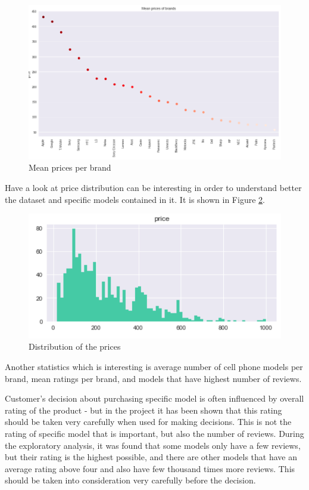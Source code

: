 \documentclass[11pt]{article}
\begin{document}
  \begin{figure}[h!]
    \centering
      \includegraphics[width=\linewidth]{meanPrices.png}
    \caption{Mean prices per brand}
    \label{fig:meanPricePerBrand}
  \end{figure}
  
  Have a look at price distribution can be interesting in order to understand better the dataset and specific models contained in it. It is shown in Figure \ref{fig:priceDistribution}. 
  
  \begin{figure}[h!]
    \centering
      \includegraphics[width=\linewidth]{priceDistribution.png}
    \caption{Distribution of the prices}
    \label{fig:priceDistribution}
  \end{figure}
  
  Another statistics which is interesting is average number of cell phone models per brand, mean ratings per brand, and models that have highest number of reviews. 
  
  Customer's decision about purchasing specific model is often influenced by overall rating of the product - but in the project it has been shown that this rating should be taken very carefully when used for making decisions. This is not the rating of specific model that is important, but also the number of reviews. During the exploratory analysis, it was found that some models only have a few reviews, but their rating is the highest possible, and there are other models that have an average rating above four and also have few thousand times more reviews. This should be taken into consideration very carefully before the decision. \par\par
  
\end{document}
